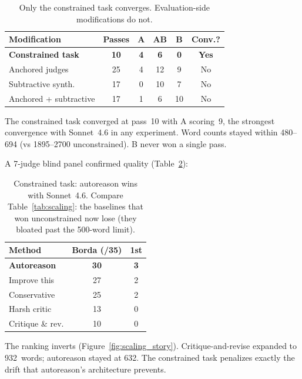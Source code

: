 \documentclass[10pt,twocolumn]{article}
\begin{document}
\begin{table}[H]
\centering
\small
\begin{tabular}{@{}lccccc@{}}
\toprule
\textbf{Modification} & \textbf{Passes} & \textbf{A} & \textbf{AB} & \textbf{B} & \textbf{Conv.?} \\
\midrule
\rowcolor{TableShade}
\textbf{Constrained task} & \textbf{10} & \textbf{4} & \textbf{6} & \textbf{0} & \textbf{Yes} \\
Anchored judges & 25 & 4 & 12 & 9 & No \\
\rowcolor{TableShade}
Subtractive synth. & 17 & 0 & 10 & 7 & No \\
Anchored + subtractive & 17 & 1 & 6 & 10 & No \\
\bottomrule
\end{tabular}
\caption{Only the constrained task converges. Evaluation-side modifications do not.}
\label{tab:v3_remedies}
\end{table}

The constrained task converged at pass~10 with A scoring~9, the strongest convergence with Sonnet~4.6 in any experiment. Word counts stayed within 480--694 (vs 1895--2700 unconstrained). B never won a single pass.

A 7-judge blind panel confirmed quality (Table~\ref{tab:constrained_quality}):

\begin{table}[H]
\centering
\small
\begin{tabular}{@{}lcc@{}}
\toprule
\textbf{Method} & \textbf{Borda (/35)} & \textbf{1st} \\
\midrule
\rowcolor{TableShade}
\textbf{Autoreason} & \textbf{30} & \textbf{3} \\
Improve this & 27 & 2 \\
\rowcolor{TableShade}
Conservative & 25 & 2 \\
Harsh critic & 13 & 0 \\
\rowcolor{TableShade}
Critique \& rev. & 10 & 0 \\
\bottomrule
\end{tabular}
\caption{Constrained task: autoreason wins with Sonnet~4.6. Compare Table~\ref{tab:scaling}: the baselines that won unconstrained now lose (they bloated past the 500-word limit).}
\label{tab:constrained_quality}
\end{table}

The ranking inverts (Figure~\ref{fig:scaling_story}). Critique-and-revise expanded to 932~words; autoreason stayed at 632. The constrained task penalizes exactly the drift that autoreason's architecture prevents.
\end{document}
